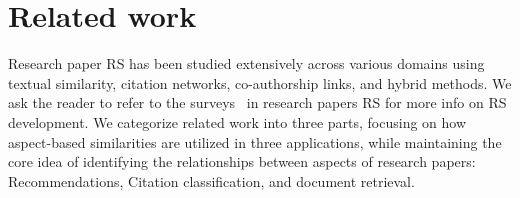 \documentclass[sigconf,anonymous]{acmart}
\begin{document}
\section{Related work}\label{sec:relatedWork}
Research paper RS has been studied extensively across various domains using textual similarity, citation networks, co-authorship links, and hybrid methods.
We ask the reader to refer to the surveys~\cite{kreutz2022scientific,pinedo2025RSSurvey,2025BaaiLitSurvey,beel2016RSSurvey,zhang2023scholarlyRSLitSur} in research papers RS for more info on RS development.
We categorize related work into three parts, focusing on how aspect-based similarities are utilized in three applications, while maintaining the core idea of identifying the relationships between aspects of research papers: Recommendations, Citation classification, and document retrieval.
\end{document}

